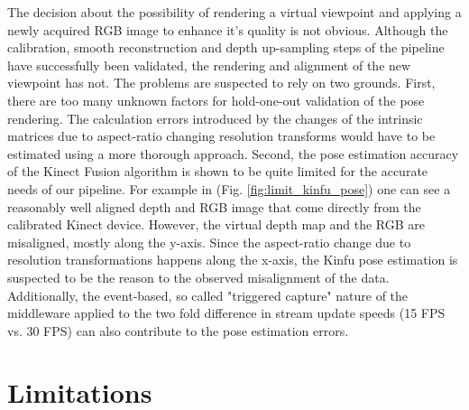 \documentclass{ucl_thesis}
\newcommand{\figref}[1]{(Fig. \ref{#1})}
\begin{document}
\par The decision about the possibility of rendering a virtual viewpoint and applying a newly acquired RGB image to enhance it's quality is not obvious. Although the calibration, smooth reconstruction and depth up-sampling steps of the pipeline have successfully been validated, the rendering and alignment of the new viewpoint has not. The problems are suspected to rely on two grounds. First, there are too many unknown factors for hold-one-out validation of the pose rendering. The calculation errors introduced by the changes of the intrinsic matrices due to aspect-ratio changing resolution transforms would have to be estimated using a more thorough approach. Second, the pose estimation accuracy of the Kinect Fusion algorithm is shown to be quite limited for the accurate needs of our pipeline. For example in \figref{fig:limit_kinfu_pose} one can see a reasonably well aligned depth and RGB image that come directly from the calibrated Kinect device. However, the virtual depth map and the RGB are misaligned, mostly along the y-axis. Since the aspect-ratio change due to resolution transformations happens along the x-axis, the Kinfu pose estimation is suspected to be the reason to the observed misalignment of the data. Additionally, the event-based, so called "triggered capture" nature of the middleware applied to the two fold difference in stream update speeds (15 FPS vs. 30 FPS) can also contribute to the pose estimation errors.

\section{Limitations} 
\label{sec:limitations}
\end{document}
